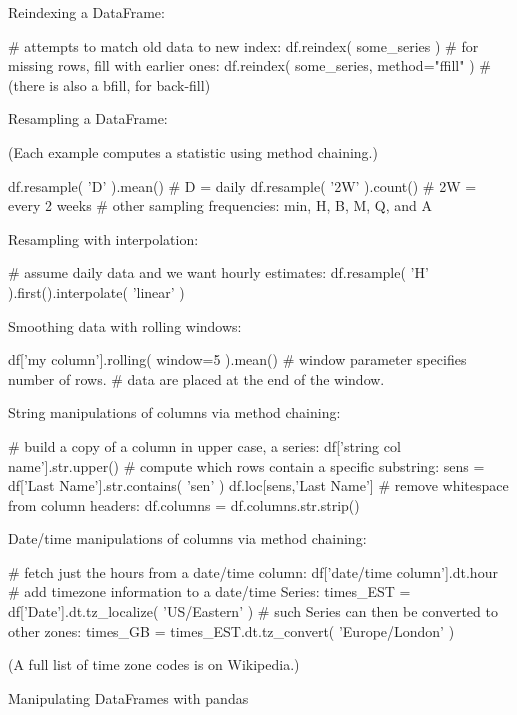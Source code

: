 \documentclass[a4paper,landscape,columns=3]{cheatsheet}
\def\chap#1{\vspace{5mm}\begin{tcolorbox}[colback=red!5!white,colframe=red!75!black,leftrule=3mm]
    \Large #1
\end{tcolorbox}}
\begin{document}
Reindexing a DataFrame:
\begin{python}
# attempts to match old data to new index:
df.reindex( some_series )
# for missing rows, fill with earlier ones:
df.reindex( some_series, method="ffill" )
# (there is also a bfill, for back-fill)
\end{python}

Resampling a DataFrame:

(Each example computes a statistic using method chaining.)
\begin{python}
df.resample( 'D' ).mean()    # D = daily
df.resample( '2W' ).count()  # 2W = every 2 weeks
# other sampling frequencies: min, H, B, M, Q, and A
\end{python}

Resampling with interpolation:
\begin{python}
# assume daily data and we want hourly estimates:
df.resample( 'H' ).first().interpolate( 'linear' )
\end{python}

Smoothing data with rolling windows:
\begin{python}
df['my column'].rolling( window=5 ).mean()
# window parameter specifies number of rows.
# data are placed at the end of the window.
\end{python}

String manipulations of columns via method chaining:
\begin{python}
# build a copy of a column in upper case, a series:
df['string col name'].str.upper()
# compute which rows contain a specific substring:
sens = df['Last Name'].str.contains( 'sen' )
df.loc[sens,'Last Name']
# remove whitespace from column headers:
df.columns = df.columns.str.strip()
\end{python}

Date/time manipulations of columns via method chaining:
\begin{python}
# fetch just the hours from a date/time column:
df['date/time column'].dt.hour
# add timezone information to a date/time Series:
times_EST = df['Date'].dt.tz_localize( 'US/Eastern' )
# such Series can then be converted to other zones:
times_GB = times_EST.dt.tz_convert( 'Europe/London' )
\end{python}

(A full list of time zone codes is on Wikipedia.)

\chap{Manipulating DataFrames with pandas}
\end{document}
